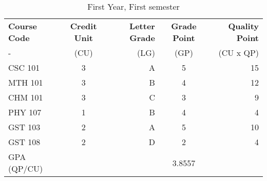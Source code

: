 \documentclass{article}
\begin{document}
	
\begin{table}[h!]
	\begin{center}
      \caption{First Year, First semester}
      \label{tab:table1}
      \begin{tabular}{l|c|r|c|r}
      	\textbf{Course Code} & \textbf{Credit Unit} & 
      	\textbf{Letter Grade} & \textbf{Grade Point} &  \textbf{Quality Point}\\
      	- & (CU) & (LG) & (GP) & (CU x QP)\\
      	\hline
      	CSC 101 & 3 & A & 5 & 15\\
      	MTH 101 & 3 & B & 4 & 12\\
      	CHM 101 & 3 & C & 3 & 9 \\
      	PHY 107 & 1 & B & 4 & 4 \\
      	GST 103 & 2 & A & 5 & 10 \\
      	GST 108 & 2 & D & 2 & 4 \\
        GPA (QP/CU) &   &   &  3.8557 \\
      \end{tabular}		
  \end{center}
\end{table}
\end{document}
